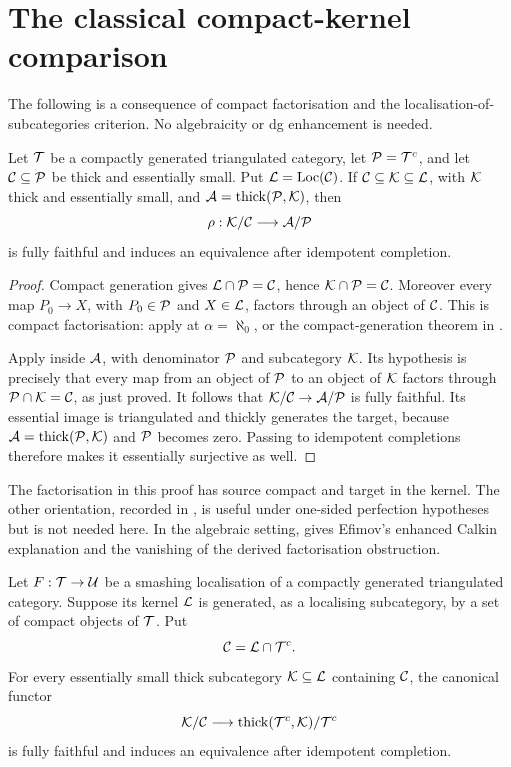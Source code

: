 \section{The classical compact-kernel comparison}\label{sec:rigidity}
The following is a consequence of compact factorisation and the localisation-of-subcategories criterion. No algebraicity or dg enhancement is needed.

\begin{theorem}\label{thm:abstract-rigidity}
Let \(\mathcal T\) be a compactly generated triangulated category, let \(\mathcal P=\mathcal T^c\), and let \(\mathcal C\subseteq\mathcal P\) be thick and essentially small. Put \(\mathcal L=\operatorname{Loc}(\mathcal C)\). If \(\mathcal C\subseteq\mathcal K\subseteq\mathcal L\), with \(\mathcal K\) thick and essentially small, and \(\mathcal A=\operatorname{thick}(\mathcal P,\mathcal K)\), then
\[
 \rho:\mathcal K/\mathcal C\longrightarrow\mathcal A/\mathcal P
\]
is fully faithful and induces an equivalence after idempotent completion.
\end{theorem}

\begin{proof}
Compact generation gives \(\mathcal L\cap\mathcal P=\mathcal C\), hence \(\mathcal K\cap\mathcal P=\mathcal C\). Moreover every map \(P_0\to X\), with \(P_0\in\mathcal P\) and \(X\in\mathcal L\), factors through an object of \(\mathcal C\). This is compact factorisation: apply \cite[Theorem~7.2.1(1)]{Krause10} at \(\alpha=\aleph_0\), or the compact-generation theorem in \cite[Section~4.4]{Neeman01}.

Apply \cite[Lemma~4.7.1(1)]{Krause10} inside \(\mathcal A\), with denominator \(\mathcal P\) and subcategory \(\mathcal K\). Its hypothesis is precisely that every map from an object of \(\mathcal P\) to an object of \(\mathcal K\) factors through \(\mathcal P\cap\mathcal K=\mathcal C\), as just proved. It follows that \(\mathcal K/\mathcal C\to\mathcal A/\mathcal P\) is fully faithful. Its essential image is triangulated and thickly generates the target, because \(\mathcal A=\operatorname{thick}(\mathcal P,\mathcal K)\) and \(\mathcal P\) becomes zero. Passing to idempotent completions therefore makes it essentially surjective as well.
\end{proof}

The factorisation in this proof has source compact and target in the kernel. The other orientation, recorded in , is useful under one-sided perfection hypotheses but is not needed here. In the algebraic setting,  gives Efimov's enhanced Calkin explanation and the vanishing of the derived factorisation obstruction.

\begin{theorem}\label{thm:smashing-comparison}
Let \(F:\mathcal T\to\mathcal U\) be a smashing localisation of a compactly generated triangulated category.  Suppose its kernel \(\mathcal L\) is generated, as a localising subcategory, by a set of compact objects of \(\mathcal T\).  Put
\[
 \mathcal C=\mathcal L\cap\mathcal T^c.
\]
For every essentially small thick subcategory \(\mathcal K\subseteq\mathcal L\) containing \(\mathcal C\), the canonical functor
\[
 \mathcal K/\mathcal C\longrightarrow
 \operatorname{thick}(\mathcal T^c,\mathcal K)/\mathcal T^c
\]
is fully faithful and induces an equivalence after idempotent completion.
\end{theorem}

